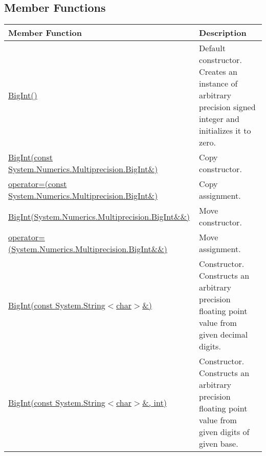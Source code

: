 \documentclass[a4paper,oneside,11.000000pt]{book}
\begin{document}
\subsection{Member Functions}
\begin{flushleft}
\begin{supertabular}[l]{!{\raggedright}p{7.575cm}!{\raggedright}p{7.575cm}}
\textbf{Member Function}
& \textbf{Description}
\\
\hline
\hyperlink{System.Numerics.Multiprecision.BigInt.constructor.P.System.Numerics.Multiprecision.BigInt}{BigInt()}
& Default constructor. Creates an instance of arbitrary precision signed integer and initializes it to zero.

\\
\hyperlink{System.Numerics.Multiprecision.BigInt.constructor.P.System.Numerics.Multiprecision.BigInt.C.R.System.Numerics.Multiprecision.BigInt}{BigInt(const System.\-Numerics.\-Multiprecision.\-BigInt\&\-)}
& Copy constructor.

\\
\hyperlink{System.Numerics.Multiprecision.BigInt.operator.assign.P.System.Numerics.Multiprecision.BigInt.C.R.System.Numerics.Multiprecision.BigInt}{operator=(const System.\-Numerics.\-Multiprecision.\-BigInt\&\-)}
& Copy assignment.

\\
\hyperlink{System.Numerics.Multiprecision.BigInt.constructor.P.System.Numerics.Multiprecision.BigInt.RR.System.Numerics.Multiprecision.BigInt}{BigInt(System.\-Numerics.\-Multiprecision.\-BigInt\&\-\&\-)}
& Move constructor.

\\
\hyperlink{System.Numerics.Multiprecision.BigInt.operator.assign.P.System.Numerics.Multiprecision.BigInt.RR.System.Numerics.Multiprecision.BigInt}{operator=(System.\-Numerics.\-Multiprecision.\-BigInt\&\-\&\-)}
& Move assignment.

\\
\hyperlink{System.Numerics.Multiprecision.BigInt.constructor.P.System.Numerics.Multiprecision.BigInt.C.R.System.String.char}{BigInt(const System.\-String$<$\-char$>$\-\&\-)}
& Constructor. Constructs an arbitrary precision floating point value from given decimal digits.

\\
\hyperlink{System.Numerics.Multiprecision.BigInt.constructor.P.System.Numerics.Multiprecision.BigInt.C.R.System.String.char.int}{BigInt(const System.\-String$<$\-char$>$\-\&\-, int)}
& Constructor. Constructs an arbitrary precision floating point value from given digits of given base.


\end{supertabular}
\end{flushleft}
\end{document}
